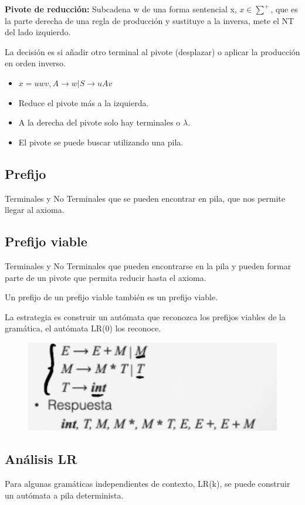 \documentclass[12pt]{report} %
\begin{document}
\textbf{Pivote de reducción:} Subcadena w de una forma sentencial x, $x \in \sum^+$, que es la parte derecha de una regla de producción y sustituye a la inversa, mete el NT del lado izquierdo. 

La decisión es si añadir otro terminal al pivote (desplazar) o aplicar la producción en orden inverso.
\begin{itemize}
  \item $x=uwv, A \rightarrow w | S \rightarrow uAv$
  \item Reduce el pivote más a la izquierda.
  \item A la derecha del pivote solo hay terminales o $\lambda$.
  \item El pivote se puede buscar utilizando una pila.
\end{itemize}

\subsection{Prefijo} 
Terminales y No Terminales que se pueden encontrar en pila, que nos permite llegar al axioma.

\subsection{Prefijo viable} 
Terminales y No Terminales que pueden encontrarse en la pila y pueden formar parte de un pivote que permita reducir hasta el axioma. 

Un prefijo de un prefijo viable también es un prefijo viable.

La estrategia es construir un autómata que reconozca los prefijos viables de la gramática, el autómata LR(0) los reconoce.

\begin{figure}[H]
	{\includegraphics[scale=.4]{2021-03-26 18_27_20-ASintactico.pdf - Foxit Reader.png}}
\end{figure}
  
\subsection{Análisis LR}
Para algunas gramáticas independientes de contexto, LR(k), se puede construir un autómata a pila determinista.
\end{document}
